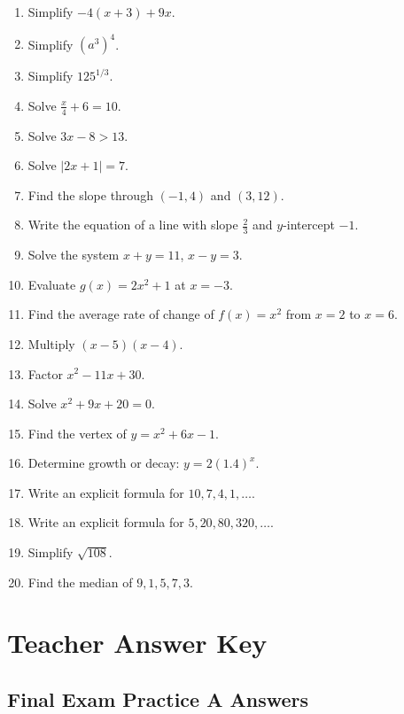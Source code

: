 \documentclass[11pt]{book}
\begin{document}
\begin{enumerate}
\item Simplify \(-4(x+3)+9x\).
\item Simplify \((a^3)^4\).
\item Simplify \(125^{1/3}\).
\item Solve \(\frac{x}{4}+6=10\).
\item Solve \(3x-8>13\).
\item Solve \(|2x+1|=7\).
\item Find the slope through \((-1,4)\) and \((3,12)\).
\item Write the equation of a line with slope \(\frac23\) and \(y\)-intercept \(-1\).
\item Solve the system \(x+y=11\), \(x-y=3\).
\item Evaluate \(g(x)=2x^2+1\) at \(x=-3\).
\item Find the average rate of change of \(f(x)=x^2\) from \(x=2\) to \(x=6\).
\item Multiply \((x-5)(x-4)\).
\item Factor \(x^2-11x+30\).
\item Solve \(x^2+9x+20=0\).
\item Find the vertex of \(y=x^2+6x-1\).
\item Determine growth or decay: \(y=2(1.4)^x\).
\item Write an explicit formula for \(10,7,4,1,\ldots\).
\item Write an explicit formula for \(5,20,80,320,\ldots\).
\item Simplify \(\sqrt{108}\).
\item Find the median of \(9,1,5,7,3\).
\end{enumerate}

\section{Teacher Answer Key}

\subsection{Final Exam Practice A Answers}
\end{document}
